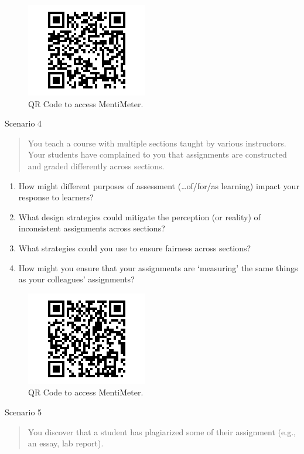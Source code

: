 \documentclass[
]{book}
\providecommand{\tightlist}{%
  \setlength{\itemsep}{0pt}\setlength{\parskip}{0pt}}
\begin{document}
\begin{figure}
\centering
\includegraphics{assets/twu-asmt/scenario3.png}
\caption{QR Code to access MentiMeter.}
\end{figure}

Scenario 4

\begin{quote}
You teach a course with multiple sections taught by various instructors. Your students have complained to you that assignments are constructed and graded differently across sections.
\end{quote}

\begin{enumerate}
\def\labelenumi{\arabic{enumi}.}
\tightlist
\item
  How might different purposes of assessment (\ldots of/for/as learning) impact your response to learners?
\item
  What design strategies could mitigate the perception (or reality) of inconsistent assignments across sections?
\item
  What strategies could you use to ensure fairness across sections?
\item
  How might you ensure that your assignments are `measuring' the same things as your colleagues' assignments?
\end{enumerate}

\begin{figure}
\centering
\includegraphics{assets/twu-asmt/scenario4.png}
\caption{QR Code to access MentiMeter.}
\end{figure}

Scenario 5

\begin{quote}
You discover that a student has plagiarized some of their assignment (e.g., an essay, lab report).
\end{quote}
\end{document}
